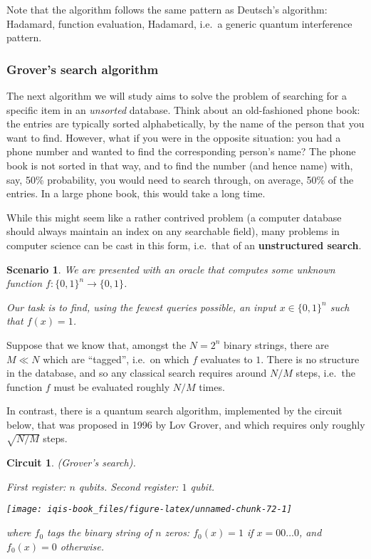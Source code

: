 \documentclass[fleqn]{article}
\newtheorem*{scenario}{Scenario}
\newtheorem*{circuit}{Circuit}
\begin{document}
Note that the algorithm follows the same pattern as Deutsch's algorithm: Hadamard, function evaluation, Hadamard, i.e.~a generic quantum interference pattern.

\hypertarget{grovers-search-algorithm}{%
\subsubsection{Grover's search algorithm}\label{grovers-search-algorithm}}

The next algorithm we will study aims to solve the problem of searching for a specific item in an \emph{unsorted} database.
Think about an old-fashioned phone book: the entries are typically sorted alphabetically, by the name of the person that you want to find.
However, what if you were in the opposite situation: you had a phone number and wanted to find the corresponding person's name?
The phone book is not sorted in that way, and to find the number (and hence name) with, say, 50\% probability, you would need to search through, on average, 50\% of the entries.
In a large phone book, this would take a long time.

While this might seem like a rather contrived problem (a computer database should always maintain an index on any searchable field), many problems in computer science can be cast in this form, i.e.~that of an \textbf{unstructured search}.

\begin{scenario}
We are presented with an oracle that computes some unknown function \(f\colon\{0,1\}^n\to\{0,1\}\).

Our task is to find, using the fewest queries possible, an input \(x\in\{0,1\}^n\) such that \(f(x)=1\).

\end{scenario}

Suppose that we know that, amongst the \(N=2^n\) binary strings, there are \(M\ll N\) which are ``tagged'', i.e.~on which \(f\) evaluates to \(1\).
There is no structure in the database, and so any classical search requires around \(N/M\) steps, i.e.~the function \(f\) must be evaluated roughly \(N/M\) times.

In contrast, there is a quantum search algorithm, implemented by the circuit below, that was proposed in 1996 by Lov Grover, and which requires only roughly \(\sqrt{N/M}\) steps.

\begin{circuit}

(Grover's search).

\emph{First register: \(n\) qubits. Second register: \(1\) qubit.}

\begin{center}\texttt{[image: iqis-book\_files/figure-latex/unnamed-chunk-72-1]} \end{center}

where \(f_0\) tags the binary string of \(n\) zeros: \(f_0(x)=1\) if \(x=00\ldots0\), and \(f_0(x)=0\) otherwise.


\end{circuit}
\end{document}
